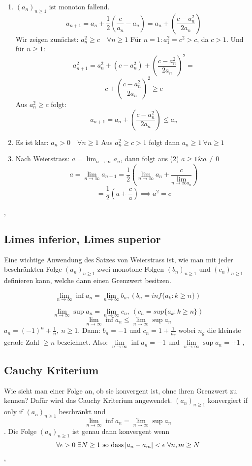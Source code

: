 \begin{enumerate}
    \item \( (a_n)_{n \geq 1}\) ist monoton fallend.
    \[ a_{n+1} = a_n + \frac{1}{2} \left( \frac{c}{a_n} - a_n\right) = a_n + \left( \frac{c - a_{n}^2}{2a_n}\right)\]
    Wir zeigen zunächst: \( a_n^2 \geq c \quad \forall n \geq 1\)
    Für \( n = 1: a_1^2 = c^2 > c\), da \( c > 1\). Und für \( n \geq 1\):
    \[ a_{n+1}^2 = a_n^2 + (c - a_n^2) + \left( \frac{c - a_n^2}{2 a_n}\right)^2 = \]
    \[ c + \left( \frac{c - a_n^2}{2 a_n}\right)^2 \geq c\]
    Aus \( a_n^2 \geq c \) folgt:
    \[ a_{n+1} = a_n + \left( \frac{c - a_n^2}{2 a_n }\right) \leq a_n \]
    \item Es ist klar: \( a_n > 0 \quad \forall n \geq 1\)
    Aus \( a_n^2 \geq c > 1\) folgt dann \( a_n \geq 1 \ \forall n \geq 1\)
    \item Nach Weierstrass: \( a = \lim_{n \rightarrow \infty } a_n\), dann folgt aus (2) \( a \geq 1 \& a \neq 0\)
    \[ a = \lim_{n \rightarrow \infty} a_{n+1} = \frac{1}{2} \left(\lim_{ n \rightarrow \infty } a_n + \frac{c}{\lim_{n \rightarrow \infty a_n}} \right)\] 
    \[= \frac{1}{2} \left( a + \frac{c}{a}\right) \implies a^2 = c\]
\end{enumerate}
\sep

\subsection{Limes inferior, Limes superior}
Eine wichtige Anwendung des Satzes von Weierstrass ist, wie man mit jeder beschränkten Folge \( (a_n)_{n \geq 1}\) zwei monotone Folgen \( (b_n)_{n \geq 1}\) und \( (c_n)_{n \geq 1}\) definieren kann, welche dann einen Grenzwert besitzen.

\[\lim\limits_{n \rightarrow \infty} \inf a_n = \lim\limits_{n \rightarrow \infty} b_n, (b_n = inf \{a_k : k \geq n\})\]


\[\lim\limits_{n \rightarrow \infty} \sup a_n = \lim\limits_{n \rightarrow \infty} c_n, \ (c_n = sup \{a_k : k \geq n\})\]
\[\lim\limits_{n \rightarrow \infty} \inf a_n \leq \lim\limits_{n \rightarrow \infty} \sup a_n\]
\Bsp[2.18] \( a_n = (-1)^n + \frac{1}{n}, \ n \geq 1\). \newline
Dann: \( b_n = -1\) und \( c_n = 1 + \frac{1}{n_g}\) wobei \( n_g\) die kleinste gerade Zahl \( \geq n\) bezeichnet. Also: \newline
\(\lim\limits_{n \rightarrow \infty} \inf a_n = -1 \) und \(\lim\limits_{n \rightarrow \infty} \sup a_n = +1\)
\sep
\subsection{Cauchy Kriterium}
Wie sieht man einer Folge an, ob sie konvergent ist, ohne ihren Grenzwert zu kennen? Dafür wird das Cauchy Kriterium angewendet. \newline
\Lemma[2.19] \((a_n)_{n \geq 1}\) konvergiert if only if \((a_n)_{n \geq 1}\) beschränkt und \[\lim\limits_{n \rightarrow \infty} \inf a_n = \lim\limits_{n \rightarrow \infty} \sup a_n\] 
. \newline Die Folge \((a_n)_{n \geq 1}\) ist genau dann konvergent wenn \[\forall \epsilon > 0 \ \exists N \geq 1 \  \text{so dass} \left\lvert a_n - a_m \right\rvert < \epsilon \ \forall n,m \geq N\]
\sep
